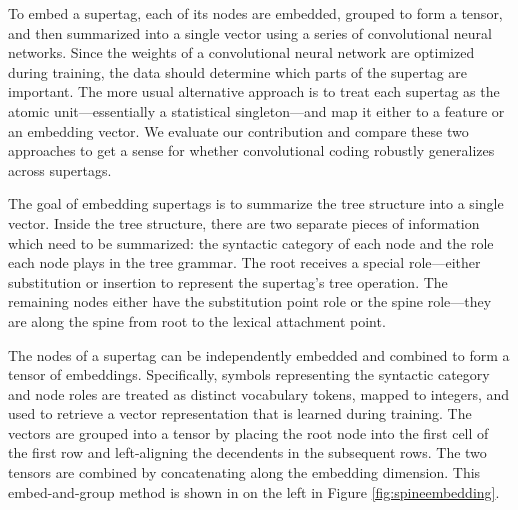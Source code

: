 \documentclass[11pt]{article}
\begin{document}
%
%
To embed a supertag, each of its nodes are embedded, grouped to form a tensor, and then summarized into a single vector using a series of convolutional neural networks.
%
Since the weights of a convolutional neural network are optimized during training, the data should determine which parts of the supertag are important.
%
%
The more usual alternative approach is to treat each supertag as the atomic
unit---essentially a statistical singleton---and map it either to a feature or
an embedding vector.
%
We evaluate our contribution and compare these two approaches to get a sense for whether convolutional coding robustly generalizes across supertags.


The goal of embedding supertags is to summarize the tree structure into a single vector.
%
Inside the tree structure, there are two separate pieces of information which need to be summarized:
the syntactic category of each node and the role each node plays in the tree grammar.
%
The root receives a special role---either substitution or insertion to represent
the supertag's tree operation.
The remaining nodes either have the substitution point role or the spine role---they are along the spine from root to the lexical attachment point.


The nodes of a supertag can be independently embedded and combined to form a
tensor of embeddings.
%
Specifically, symbols representing the syntactic category and node roles are treated as
distinct vocabulary tokens, mapped to integers, and used to retrieve a vector
representation that is learned during training.
%
The vectors are grouped into a tensor by placing the root node into the
first cell of the first row and left-aligning the decendents in the subsequent rows.
%
The two tensors are combined by concatenating along the embedding dimension.
%
This embed-and-group method is shown in on the left in Figure \ref{fig:spineembedding}.
\end{document}
